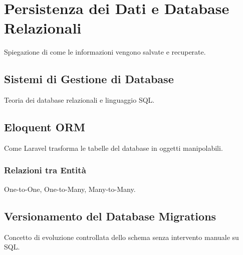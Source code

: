 \section{Persistenza dei Dati e Database Relazionali}
Spiegazione di come le informazioni vengono salvate e recuperate.

\subsection{Sistemi di Gestione di Database} 
Teoria dei database relazionali e linguaggio SQL.

\subsection{Eloquent ORM} 
Come Laravel trasforma le tabelle del database in oggetti manipolabili.

\subsubsection{Relazioni tra Entità} 
One-to-One, One-to-Many, Many-to-Many.

\subsection{Versionamento del Database Migrations} 
Concetto di evoluzione controllata dello schema senza intervento manuale su SQL.